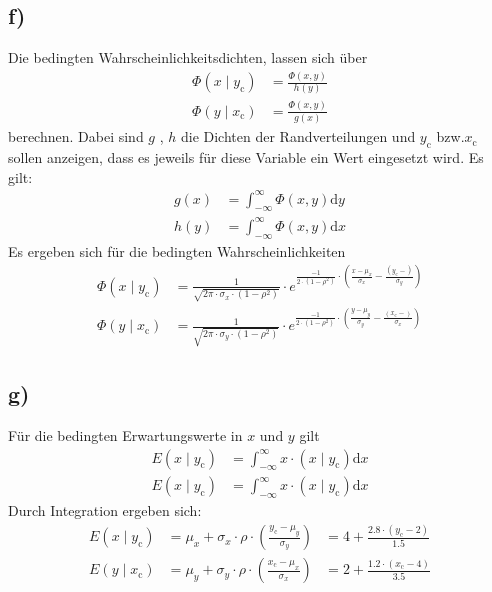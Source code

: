 \subsection{f)}
\label{subsec:a4f}
Die bedingten Wahrscheinlichkeitsdichten, lassen sich über
\\
\begin{align}
  \label{eqn:bedwahr}
  \Phi(x\mid y_\text{c}) &= \frac{\Phi \left( x,y \right)}{h \left( y \right)}\\
  \Phi(y\mid x_\text{c}) &= \frac{\Phi \left( x,y \right)}{g \left( x \right)}
\end{align}
berechnen. Dabei sind $g$ , $h$ die Dichten der Randverteilungen und $y_\text{c}$ bzw.$x_\text{c}$ sollen anzeigen, dass es jeweils für diese Variable ein Wert
eingesetzt wird. Es gilt:
\\
\begin{align}
  g\left( x \right) &= \int_{-\infty}^{\infty} \Phi\left( x,y \right) \mathrm{d}y\\
  h\left( y \right) &= \int_{-\infty}^{\infty} \Phi\left( x,y \right) \mathrm{d}x
\end{align}
Es ergeben sich für die bedingten Wahrscheinlichkeiten
\\
\begin{align}
  \Phi\left( x\mid y_\text{c} \right) &= \frac{1}{\sqrt{2\pi \cdot \sigma_{x} \cdot\left( 1 - \rho^{2} \right)}}
  \cdot e^{\frac{-1}{2\cdot\left( 1-\rho^{2} \right)} \cdot \left( \frac{x - \mu_{x}}{\sigma_{x}} - \frac{\left( y_\text{c} -  \right)}{\sigma_{y}} \right)}\\
  \Phi\left( y\mid x_\text{c} \right) &= \frac{1}{\sqrt{2\pi \cdot \sigma_{y} \cdot\left( 1 - \rho^{2} \right)}}
  \cdot e^{\frac{-1}{2\cdot\left( 1-\rho^{2} \right)} \cdot \left( \frac{y - \mu_{y}}{\sigma_{y}} - \frac{\left( x_\text{c} -  \right)}{\sigma_{x}} \right)}
\end{align}

\subsection{g)}
\label{subsec:a4g}
Für die bedingten Erwartungswerte in $x$ und $y$ gilt
\\
\begin{align}
  E\left( x \mid y_\text{c} \right) &= \int_{-\infty}^{\infty} x \cdot
  \left( x \mid y_\text{c} \right) \mathrm{d}x \\
  E\left( x \mid y_\text{c} \right) &= \int_{-\infty}^{\infty} x \cdot
  \left( x \mid y_\text{c} \right) \mathrm{d}x
\end{align}
Durch Integration ergeben sich:
\\
\begin{align}
  E\left( x \mid y_\text{c} \right) &= \mu_{x} + \sigma_{x} \cdot
  \rho \cdot \left( \frac{y_\text{c} - \mu_{y}}{\sigma_{y}} \right) &= 4 + \frac{2.8 \cdot\left( y_\text{c} - 2 \right)}{1.5}\\
  E\left( y \mid x_\text{c} \right) &= \mu_{y} + \sigma_{y} \cdot
  \rho \cdot \left( \frac{x_\text{c} - \mu_{x}}{\sigma_{x}} \right) &= 2 + \frac{1.2 \cdot\left( x_\text{c} - 4\right)}{3.5}
\end{align}
